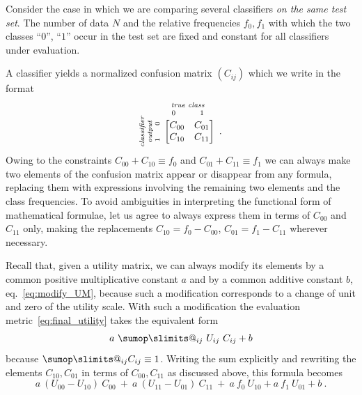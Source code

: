 \documentclass[\ifafour a4paper,12pt,\else a5paper,10pt,\fi%
onecolumn,oneside,article,%
british%
]{memoir}
\makeatletter
\theoremstyle{remark}
\theoremstyle{innote}
\def\sum{\DOTSI\sumop\slimits@}
\renewcommand*{\|}[1][]{\nonscript\:#1\vert\nonscript\:\mathopen{}}
\newcommand*{\eqn}{eq.}%
\newcommand*{\umatrix}[4]{\begin{bmatrix*}[r]#1&#2\\#3&#4\end{bmatrix*}}
\makeatother
\begin{document}
Consider the case in which we are comparing several classifiers \emph{on the same test set}. The number of data $N$ and the relative frequencies $f_{0}, f_{1}$ with which the two classes \enquote{$0$}, \enquote{$1$} occur in the test set are fixed and constant for all classifiers under evaluation.

A classifier yields a normalized confusion matrix $(C_{ij})$ which we write in the format
\begin{equation*}
  \rotatebox[origin=c]{90}{
    \clap{\textit{\parbox{5em}{\centering\scriptsize classifier\\output\\$1\hspace{1.5em}0$}}
    }}\ 
    \overbracket[0pt]{
      \umatrix{ C_{00} }{ C_{01} }{ C_{10} }{ C_{11}
      }}^{
      \clap{\textit{\parbox{6em}{\centering\scriptsize true class\\$0\hspace{3em}1$}}
    }} \ .
\end{equation*}

Owing to the constraints $C_{00} + C_{10} \equiv f_{0}$ and $C_{01} + C_{11} \equiv f_{1}$ we can always make two elements of the confusion matrix appear or disappear from any formula, replacing them with expressions involving the remaining two elements and the class frequencies. To avoid ambiguities in interpreting the functional form of mathematical formulae, let us agree to always express them in terms of $C_{00}$ and $C_{11}$ only, making the replacements $C_{10} = f_{0} - C_{00}$, $C_{01} = f_{1} - C_{11}$ wherever necessary.

Recall that, given a utility matrix, we can always modify its elements by a common positive multiplicative constant $a$ and by a common additive constant $b$, \eqn~\eqref{eq:modify_UM}, because such a modification corresponds to a change of unit and zero of the utility scale. With such a modification the evaluation metric~\eqref{eq:final_utility} takes the equivalent form
\begin{equation}
  \label{eq:final_utility_modified}
 a\ \sum_{ij} \ U_{ij}\ C_{ij} + b
\end{equation}
because $\sum_{ij} C_{ij} \equiv 1$. Writing the sum explicitly and rewriting the elements $C_{10}, C_{01}$ in terms of $C_{00}, C_{11}$ as discussed above, this formula becomes 
\begin{equation}
  \label{eq:final_utility_binary}
    a\ (U_{00} - U_{10})\ C_{00} \ + \ 
    a\ (U_{11} - U_{01})\ C_{11} \ + \ 
    a\ f_{0}\ U_{10} + a\ f_{1}\ U_{01} +  b \ .
\end{equation}
\end{document}
